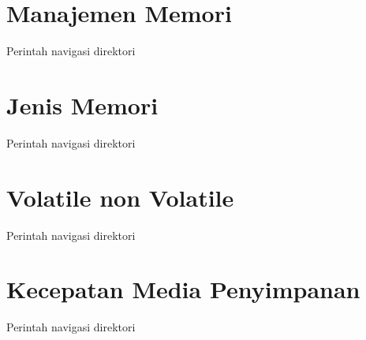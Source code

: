 \section{Manajemen Memori}
Perintah navigasi direktori

\section{Jenis Memori}
Perintah navigasi direktori

\section{Volatile non Volatile}
Perintah navigasi direktori

\section{Kecepatan Media Penyimpanan}
Perintah navigasi direktori